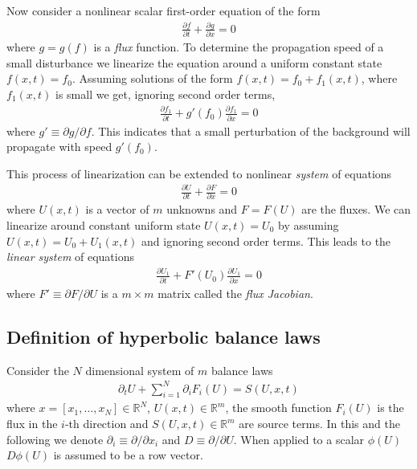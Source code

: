 \documentclass[11pt, reqno]{amsart}
\newcommand{\pfrac}[2]{\frac{\partial #1}{\partial #2}}
\newcommand{\pfracb}[2]{\partial #1/\partial #2}
\newcommand{\spfrac}[2]{{\partial_{#1}} {#2}}
\theoremstyle{definition}
\begin{document}
Now consider a nonlinear scalar first-order equation of the form
\begin{align}
  \pfrac{f}{t} + \pfrac{g}{x} = 0
\end{align}
where $g=g(f)$ is a \emph{flux} function. To determine the propagation
speed of a small disturbance we linearize the equation around a
uniform constant state $f(x,t) = f_0$. Assuming solutions of the form
$f(x,t) = f_0 + f_1(x,t)$, where $f_1(x,t)$ is small we get, ignoring
second order terms,
\begin{align}
  \pfrac{f_1}{t} + g'(f_0)\pfrac{f_1}{x} = 0  
\end{align}
where $g' \equiv \pfracb{g}{f}$. This indicates that a small
perturbation of the background will propagate with speed $g'(f_0)$.

This process of linearization can be extended to nonlinear
\emph{system} of equations
\begin{align}
  \pfrac{U}{t} + \pfrac{F}{x} = 0
  \label{eq:hypeqn}
\end{align}
where $U(x,t)$ is a vector of $m$ unknowns and $F=F(U)$ are the
fluxes. We can linearize around constant uniform state $U(x,t)=U_0$ by
assuming $U(x,t) = U_0+U_1(x,t)$ and ignoring second order terms. This
leads to the \emph{linear system} of equations
\begin{align}
  \pfrac{U_1}{t} + F'(U_0)\pfrac{U_1}{x} = 0  
\end{align}
where $F' \equiv \pfracb{F}{U}$ is a $m\times m$ matrix called the
\emph{flux Jacobian}.

\subsection{Definition of hyperbolic balance laws}

Consider the $N$ dimensional system of $m$ balance laws
\begin{align}
  \spfrac{t}{U} + \sum_{i=1}^N \spfrac{i}{F_i(U)} = S(U,x,t) 
  \label{eq:hypbalance}
\end{align}
where $x = [x_1,\ldots,x_N] \in \mathbb{R}^N$, $U(x,t) \in
\mathbb{R}^m$, the smooth function $F_i(U)$ is the flux in the $i$-th
direction and $S(U,x,t) \in \mathbb{R}^m$ are source terms. In this
and the following we denote $\partial_i \equiv \partial/\partial x_i$
and $D \equiv \partial/\partial U$. When applied to a scalar $\phi(U)$
$D\phi(U)$ is assumed to be a row vector.
\end{document}
